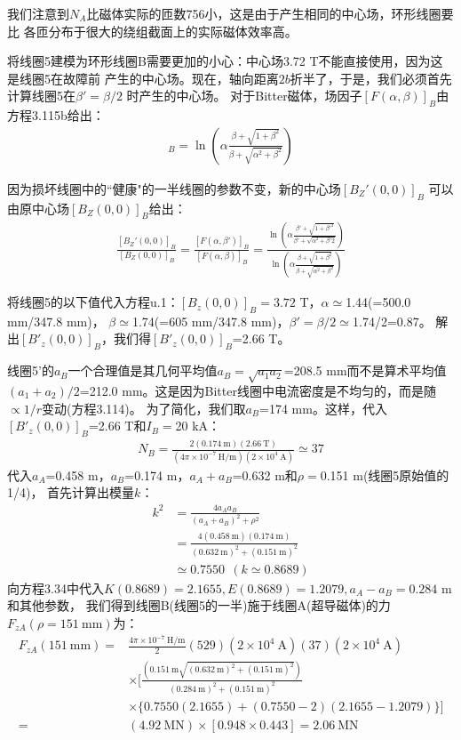 我们注意到$N_A$比磁体实际的匝数756小，这是由于产生相同的中心场，环形线圈要比
各匝分布于很大的绕组截面上的实际磁体效率高。

将线圈5建模为环形线圈B需要更加的小心：中心场3.72 T不能直接使用，因为这是线圈5在故障前
产生的中心场。现在，轴向距离$2b$折半了，于是，我们必须首先计算线圈5在$\beta'=\beta/2$
时产生的中心场。
对于Bitter磁体，场因子$[F(\alpha,\beta)]_B$由方程3.115b给出：
\begin{align*}%
[F(\alpha,\beta)]_B=\ln\left(\alpha\frac{\beta+\sqrt{1+\beta^2}}{\beta+\sqrt{\alpha^2+\beta^2}}\right) \tag{3.115b}
\end{align*}

因为损坏线圈中的``健康"的一半线圈的参数不变，新的中心场$[B_Z'(0,0)]_B$
可以由原中心场$[B_Z(0,0)]_B$给出：
\begin{align*}%
\frac{[B_Z'(0,0)]_B}{[B_Z(0,0)]_B}
=\frac{[F(\alpha,\beta')]_B}{[F(\alpha,\beta)]_B}
=\frac{\ln(\alpha\frac{\beta'+\sqrt{1+\beta'^2}}{\beta'+\sqrt{\alpha^2+\beta'2}})}{\ln(\alpha\frac{\beta+\sqrt{1+\beta^2}}{\beta+\sqrt{\alpha^2+\beta^2}})} \tag{u.1}
\end{align*}

将线圈5的以下值代入方程u.1：$[B_z(0,0)]_B=3.72$ T，$\alpha\simeq$1.44(=500.0 mm/347.8 mm)，
$\beta\simeq$1.74(=605 mm/347.8 mm)，$\beta'=\beta/2\simeq$1.74/2=0.87。
解出$[B'_z(0,0)]_B$，我们得$[B'_z(0,0)]_B$=2.66 T。

线圈5'的$a_B$一个合理值是其几何平均值$a_B=\sqrt{a_1 a_2}$=208.5 mm而不是算术平均值
$(a_1+a_2)/2$=212.0 mm。这是因为Bitter线圈中电流密度是不均匀的，而是随$\propto 1/r$变动(方程3.114)。
为了简化，我们取$a_B$=174 mm。这样，代入$[B'_z(0,0)]_B$=2.66 T和$I_B=$20 kA：
\begin{align*}%
N_B=\frac{2(0.174\ \mathrm{m})(2.66\ \mathrm{T})}{(4\pi\times 10^{-7}\ \mathrm{H/m})(2\times 10^4\ \mathrm{A})}\simeq 37
\end{align*}
代入$a_A$=0.458 m，$a_B$=0.174 m，$a_A+a_B$=0.632 m和$\rho=$0.151 m(线圈5原始值的1/4)，
首先计算出模量$k$：
\begin{align*}%
k^2&=\frac{4a_Aa_B}{(a_A+a_B)^2+\rho^2}\\ \tag{3.36}
&=\frac{4(0.458\ \mathrm{m})(0.174\ \mathrm{m})}{(0.632\ \mathrm{m})^2+(0.151\ \mathrm{m})^2}\\
&\simeq 0.7550\ \ (k\simeq 0.8689)
\end{align*}
向方程3.34中代入$K(0.8689)=2.1655, E(0.8689)=1.2079, a_A-a_B=0.284$ m和其他参数，
我们得到线圈B(线圈5的一半)施于线圈A(超导磁体)的力$F_{zA}(\rho=151\ \mathrm{mm})$为：
\begin{align*}%
F_{zA}(151\ \mathrm{mm})=&\frac{4\pi\times10^{-7}\ \mathrm{H/m}}{2}(529)(2\times 10^4\ \mathrm{A})(37)(2\times 10^4\ \mathrm{A})\\
&\times[\frac{(0.151\ \mathrm{m}\sqrt{(0.632\ \mathrm{m})^2+(0.151 \ \mathrm{m})^2})}{(0.284\ \mathrm{m})^2+(0.151\ \mathrm{m})^2}\\
&\times\{0.7550(2.1655)+(0.7550-2)(2.1655-1.2079)\}]\\
=&(4.92\ \mathrm{MN})\times[0.948\times 0.443]=2.06\ \mathrm{MN}
\end{align*}

